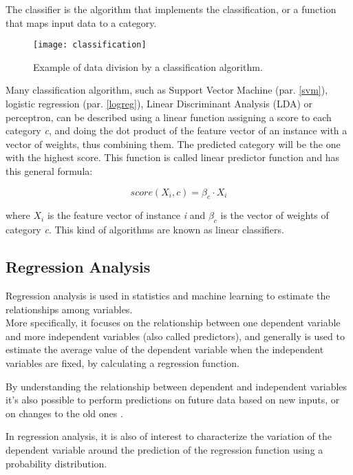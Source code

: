 The classifier is the algorithm that implements the classification, or a function that maps input data to a category.

\begin{figure}[H]
	\centering
	\texttt{[image: classification]}
	\caption{Example of data division by a classification algorithm.}
	\label{fig:classification}
\end{figure}	

Many classification algorithm, such as Support Vector Machine (par. \ref{svm}), logistic regression (par. \ref{logreg}), Linear Discriminant Analysis (LDA) or perceptron, can be described using a linear function assigning a score to each category \textit{c}, and doing the dot product of the feature vector of an instance with a vector of weights, thus combining them. The predicted category will be the one with the highest score. This function is called linear predictor function and has this general formula:

\begin{equation}
score(X_i, c) = \beta_c \cdot X_i
\end{equation}

where $X_i$ is the feature vector of instance \textit{i} and $\beta_c$ is the vector of weights of category \textit{c}. This kind of algorithms are known as linear classifiers.

\subsection{Regression Analysis} \label{regression}

Regression analysis is used in statistics and machine learning to estimate the relationships among variables. \\
More specifically, it focuses on the relationship between one dependent variable and more independent variables (also called predictors), and generally is used to estimate the average value of the dependent variable when the independent variables are fixed, by calculating a regression function.

By understanding the relationship between dependent and independent variables it's also possible to perform predictions on future data based on new inputs, or on changes to the old ones \cite{wiki:reg_an}.

In regression analysis, it is also of interest to characterize the variation of the dependent variable around the prediction of the regression function using a probability distribution.

